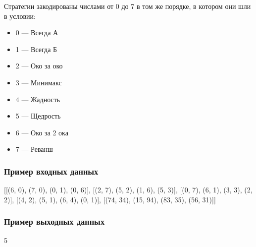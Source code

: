 Стратегии закодированы числами от 0 до 7 в том же порядке, в котором они шли в условии:

\begin{itemize}
    \item 0 — Всегда А
    \item 1 — Всегда Б
    \item 2 — Око за око
    \item 3 — Минимакс
    \item 4 — Жадность
    \item 5 — Щедрость
    \item 6 — Око за 2 ока
    \item 7 — Реванш
\end{itemize}

\subsubsection*{Пример входных данных}
[[(6, 0), (7, 0), (0, 1), (0, 6)], [(2, 7), (5, 2), (1, 6), (5, 3)], [(0, 7), (6, 1), (3, 3), (2, 2)], [(4, 2), (5, 1), (6, 4), (0, 1)], [(74, 34), (15, 94), (83, 35), (56, 31)]]

\subsubsection*{Пример выходных данных}
5

